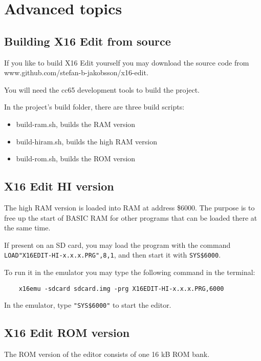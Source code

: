 \documentclass{article}
\begin{document}
\section{Advanced topics}

    \subsection{Building X16 Edit from source}
        If you like to build X16 Edit yourself you may download the source code from
        www.github.com/stefan-b-jakobsson/x16-edit.

        You will need the cc65 development tools to build the project.

        In the project's build folder, there are three build scripts:

        \begin{itemize}
            \item build-ram.sh, builds the RAM version
            \item build-hiram.sh, builds the high RAM version
            \item build-rom.sh, builds the ROM version
        \end{itemize}

    \subsection{X16 Edit HI version}
        The high RAM version is loaded into RAM at address \$6000. The purpose is to
        free up the start of BASIC RAM for other programs that can be loaded there at
        the same time.

        If present on an SD card, you may load the program with the command \break
        \texttt{LOAD"X16EDIT-HI-x.x.x.PRG",8,1}, and then
        start it with \texttt{SYS\$6000}.

        To run it in the emulator you may type the following command in the terminal:

\begin{verbatim}
    x16emu -sdcard sdcard.img -prg X16EDIT-HI-x.x.x.PRG,6000
\end{verbatim}
        In the emulator, type \texttt{"SYS\$6000"} to start the editor.

    \subsection{X16 Edit ROM version}
        The ROM version of the editor consists of one 16 kB ROM bank.
\end{document}
